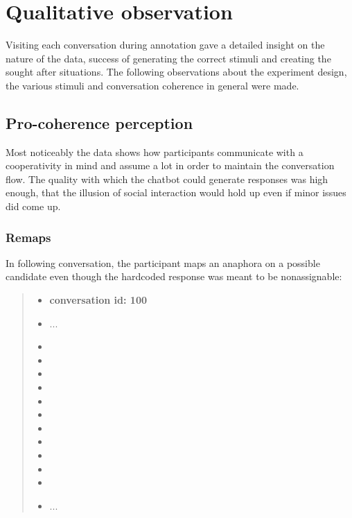 \chapter{Qualitative observation}

Visiting each conversation during annotation
gave a detailed insight on the nature of the data,
success of generating the correct stimuli and
creating the sought after situations.
The following observations about
the experiment design, the various stimuli and conversation coherence in general
were made.

\section{Pro-coherence perception}

Most noticeably the data shows how participants communicate with a cooperativity in mind
and assume a lot in order to maintain the conversation flow.
The quality with which the chatbot could generate responses was high enough,
that the illusion of social interaction would hold up even if minor issues did come up.

\subsection{Remaps}

In following conversation, the participant maps an anaphora on a possible candidate
even though the hardcoded response was meant to be nonassignable:

    \begin{quote}
    \begin{itemize}[label={}, leftmargin=0pt, itemsep=0.5em]
    \item \textbf{conversation id: 100}
    \item ...
    \item {}
    \item {}
    \item {}
    \item {}
    \item {}
    \item {}
    \item {}
    \item {}
    \item {}
    \item {}
    \item {}
    \item ...
    \end{itemize}
    \end{quote}


